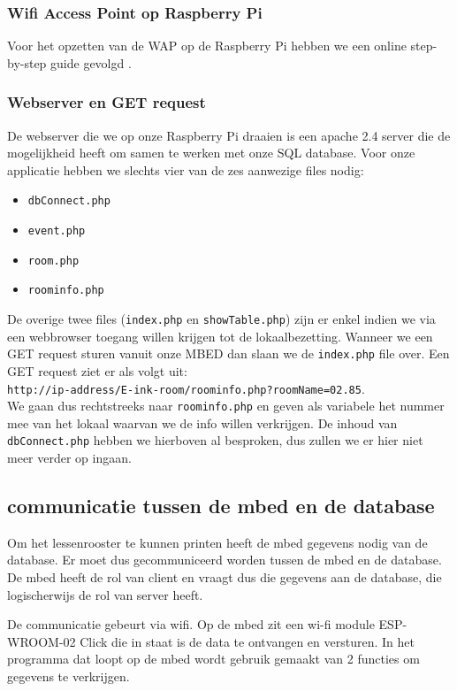 \documentclass[a4paper,kul]{kulakarticle} %
\begin{document}
\subsubsection{Wifi Access Point op Raspberry Pi}
Voor het opzetten van de WAP op de Raspberry Pi hebben we een online step-by-step guide gevolgd \cite{RaspberryPiWAP}.
\subsubsection{Webserver en GET request}
De webserver die we op onze Raspberry Pi draaien is een apache 2.4 server die de mogelijkheid heeft om samen te werken met onze SQL database. Voor onze applicatie hebben we slechts vier van de zes aanwezige files nodig: 
\begin{itemize}
	\item \verb|dbConnect.php|
	\item \verb|event.php|
	\item \verb|room.php|
	\item \verb|roominfo.php|
\end{itemize}
De overige twee files (\verb|index.php| en \verb|showTable.php|) zijn er enkel indien we via een webbrowser toegang willen krijgen tot de lokaalbezetting. Wanneer we een GET request sturen vanuit onze MBED dan slaan we de \verb|index.php| file over. Een GET request ziet er als volgt uit: \\ \verb|http://ip-address/E-ink-room/roominfo.php?roomName=02.85|. \\ We gaan dus rechtstreeks naar \verb|roominfo.php| en geven als variabele het nummer mee van het lokaal waarvan we de info willen verkrijgen.  De inhoud van \verb|dbConnect.php| hebben we hierboven al besproken, dus zullen we er hier niet meer verder op ingaan.
\newpage

\subsection{communicatie tussen de mbed en de database}

Om het lessenrooster te kunnen printen heeft de mbed gegevens nodig van de database. Er moet dus gecommuniceerd worden tussen de mbed en de database. De mbed heeft de rol van client en vraagt dus die gegevens aan de database, die logischerwijs de rol van server heeft.
\newline

De communicatie gebeurt via wifi. Op de mbed zit een wi-fi module ESP-WROOM-02 Click \cite{ESP-WROOM-02} die in staat is de data te ontvangen en versturen. In het programma dat loopt op de mbed wordt gebruik gemaakt van 2 functies om gegevens te verkrijgen.
\end{document}
